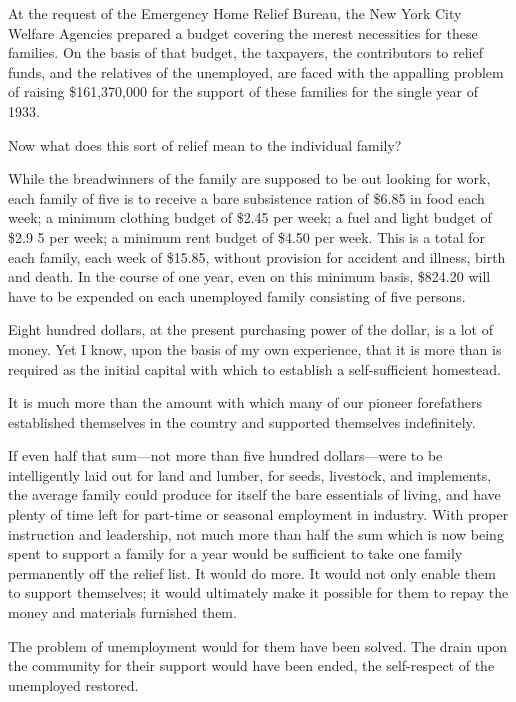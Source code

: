 \documentclass{book}
\begin{document}
At the request of the Emergency Home Relief Bureau, the New York City Welfare Agencies prepared a budget covering the merest necessities for these families. On the basis of that budget, the taxpayers, the contributors to relief funds, and the relatives of the unemployed, are faced with the appalling problem of raising \$161,370,000 for the support of these families for the single year of 1933.

Now what does this sort of relief mean to the individual family?

While the breadwinners of the family are supposed to be out looking for work, each family of five is to receive a bare subsistence ration of \$6.85 in food each week; a minimum clothing budget of \$2.45 per week; a fuel and light budget of \$2.9 5 per week; a minimum rent budget of \$4.50 per week. This is a total for each family, each week of \$15.85, without provision for accident and illness, birth and death. In the course of one year, even on this minimum basis, \$824.20 will have to be expended on each unemployed family consisting of five persons.

Eight hundred dollars, at the present purchasing power of the dollar, is a lot of money. Yet I know, upon the basis of my own experience, that it is more than is required as the initial capital with which to establish a self-sufficient homestead.

It is much more than the amount with which many of our pioneer forefathers established themselves in the country and supported themselves indefinitely.

If even half that sum—not more than five hundred dollars—were to be intelligently laid out for land and lumber, for seeds, livestock, and implements, the average family could produce for itself the bare essentials of living, and have plenty of time left for part-time or seasonal employment in industry. With proper instruction and leadership, not much more than half the sum which is now being spent to support a family for a year would be sufficient to take one family permanently off the relief list. It would do more. It would not only enable them to support themselves; it would ultimately make it possible for them to repay the money and materials furnished them.

The problem of unemployment would for them have been solved. The drain upon the community for their support would have been ended, the self-respect of the unemployed restored.
\end{document}
